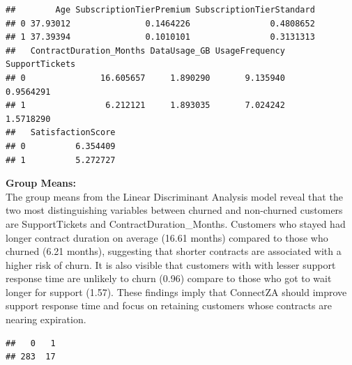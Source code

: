 \documentclass[
]{article}
\newenvironment{Shaded}{\begin{snugshade}}{\end{snugshade}}
\newcommand{\AttributeTok}[1]{\textcolor[rgb]{0.13,0.29,0.53}{#1}}
\newcommand{\FunctionTok}[1]{\textcolor[rgb]{0.13,0.29,0.53}{\textbf{#1}}}
\newcommand{\NormalTok}[1]{#1}
\newcommand{\OtherTok}[1]{\textcolor[rgb]{0.56,0.35,0.01}{#1}}
\newcommand{\SpecialCharTok}[1]{\textcolor[rgb]{0.81,0.36,0.00}{\textbf{#1}}}
\begin{document}
\begin{Shaded}
\end{Shaded}

\begin{verbatim}
##        Age SubscriptionTierPremium SubscriptionTierStandard
## 0 37.93012               0.1464226                0.4808652
## 1 37.39394               0.1010101                0.3131313
##   ContractDuration_Months DataUsage_GB UsageFrequency SupportTickets
## 0               16.605657     1.890290       9.135940      0.9564291
## 1                6.212121     1.893035       7.024242      1.5718290
##   SatisfactionScore
## 0          6.354409
## 1          5.272727
\end{verbatim}

\hfill\break
\textbf{Group Means:}\\
The group means from the Linear Discriminant Analysis model reveal that
the two most distinguishing variables between churned and non-churned
customers are SupportTickets and ContractDuration\_Months. Customers who
stayed had longer contract duration on average (16.61 months) compared
to those who churned (6.21 months), suggesting that shorter contracts
are associated with a higher risk of churn. It is also visible that
customers with with lesser support response time are unlikely to churn
(0.96) compare to those who got to wait longer for support (1.57). These
findings imply that ConnectZA should improve support response time and
focus on retaining customers whose contracts are nearing expiration.\\

\begin{Shaded}
\end{Shaded}

\begin{verbatim}
##   0   1 
## 283  17
\end{verbatim}
\end{document}
